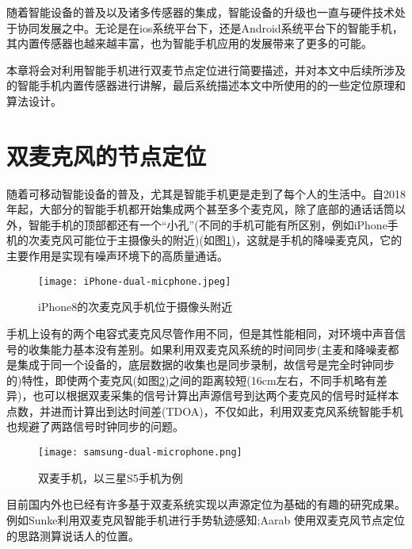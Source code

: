 \documentclass[winfonts]{njuthesis}
\begin{document}
	随着智能设备的普及以及诸多传感器的集成，智能设备的升级也一直与硬件技术处于协同发展之中。无论是在ios系统平台下，还是Android系统平台下的智能手机，其内置传感器也越来越丰富，也为智能手机应用的发展带来了更多的可能。

	本章将会对利用智能手机进行双麦节点定位进行简要描述，并对本文中后续所涉及的智能手机内置传感器进行讲解，最后系统描述本文中所使用的的一些定位原理和算法设计。

	\section{双麦克风的节点定位}
	
	随着可移动智能设备的普及，尤其是智能手机更是走到了每个人的生活中。自2018年起，大部分的智能手机都开始集成两个甚至多个麦克风，除了底部的通话话筒以外，智能手机的顶部都还有一个“小孔”(不同的手机可能有所区别，例如iPhone手机的次麦克风可能位于主摄像头的附近)(如图\ref{fig: iphone-dual-microphone})，这就是手机的降噪麦克风，它的主要作用是实现有噪声环境下的高质量通话。
	
	\begin{figure}[H]
		\centering
		\texttt{[image: iPhone-dual-micphone.jpeg]} 
		\caption{iPhone8的次麦克风手机位于摄像头附近}
		\label{fig: iphone-dual-microphone}
	\end{figure}
	
	手机上设有的两个电容式麦克风尽管作用不同，但是其性能相同，对环境中声音信号的收集能力基本没有差别。如果利用双麦克风系统的时间同步(主麦和降噪麦都是集成于同一个设备的，底层数据的收集也是同步录制，故信号是完全时钟同步的)特性，即使两个麦克风(如图\ref{fig: samsung-dual-microphone})之间的距离较短(16cm左右，不同手机略有差异)，也可以根据双麦采集的信号计算出声源信号到达两个麦克风的信号时延样本点数，并进而计算出到达时间差(TDOA)，不仅如此，利用双麦克风系统智能手机也规避了两路信号时钟同步的问题。
	
	\begin{figure}[H]
		\centering
		\texttt{[image: samsung-dual-microphone.png]} 
		\caption{双麦手机，以三星S5手机为例}
		\label{fig: samsung-dual-microphone}
	\end{figure}
	
	目前国内外也已经有许多基于双麦系统实现以声源定位为基础的有趣的研究成果。例如Sunke利用双麦克风智能手机进行手势轨迹感知\cite{VSkin};Aarab 使用双麦克风节点定位的思路测算说话人的位置\cite{DMArrays}。
	
\end{document}
